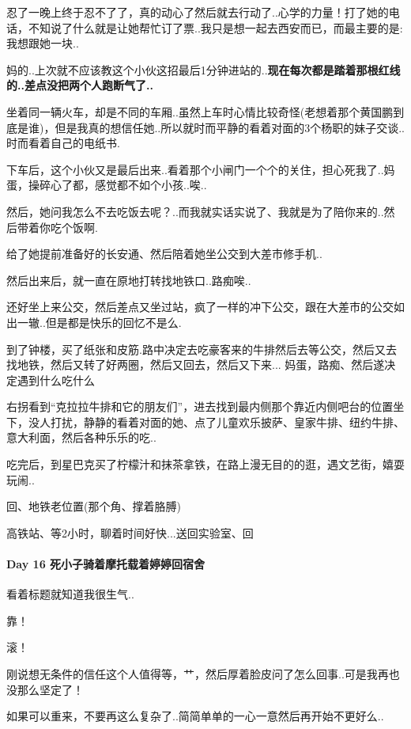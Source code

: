 \documentclass[UTF8,a4paper,8pt]{ctexbook}
\begin{document}
	 	 忍了一晚上终于忍不了了，真的动心了然后就去行动了..心学的力量！打了她的电话，不知说了什么就是让她帮忙订了票..我只是想一起去西安而已，而最主要的是:我想跟她一块..
	 	 
	 	 妈的..上次就不应该教这个小伙这招最后1分钟进站的..\textbf{现在每次都是踏着那根红线的..差点没把两个人跑断气了..}
	 	 
	 	 坐着同一辆火车，却是不同的车厢..虽然上车时心情比较奇怪(老想着那个黄国鹏到底是谁)，但是我真的想信任她..所以就时而平静的看着对面的3个杨职的妹子交谈..时而看着自己的电纸书.
	 	 
	 	 下车后，这个小伙又是最后出来..看着那个小闸门一个个的关住，担心死我了..妈蛋，操碎心了都，感觉都不如个小孩..唉..
	 	 
	 	 然后，她问我怎么不去吃饭去呢？..而我就实话实说了、我就是为了陪你来的..然后带着你吃个饭啊.
	 	 
	 	 给了她提前准备好的长安通、然后陪着她坐公交到大差市修手机..
	 	 
	 	 然后出来后，就一直在原地打转找地铁口..路痴唉..
	 	 
	 	 还好坐上来公交，然后差点又坐过站，疯了一样的冲下公交，跟在大差市的公交如出一辙..但是都是快乐的回忆不是么.
	 	 
	 	 到了钟楼，买了纸张和皮筋.路中决定去吃豪客来的牛排然后去等公交，然后又去找地铁，然后又转了好两圈，然后又回去，然后又下来... 妈蛋，路痴、然后遂决定遇到什么吃什么
	 	 
	 	 右拐看到“克拉拉牛排和它的朋友们”，进去找到最内侧那个靠近内侧吧台的位置坐下，没人打扰，静静的看着对面的她、点了儿童欢乐披萨、皇家牛排、纽约牛排、意大利面，然后各种乐乐的吃..
	 	 
	 	 吃完后，到星巴克买了柠檬汁和抹茶拿铁，在路上漫无目的的逛，遇文艺街，嬉耍玩闹..
	 	 
	 	 回、地铁老位置(那个角、撑着胳膊)
	 	 
	 	 高铁站、等2小时，聊着时间好快...送回实验室、回
 	 \paragraph{Day 16  死小子骑着摩托载着婷婷回宿舍  \quad     }
	 	 看着标题就知道我很生气..
	 	 
	 	 靠！
	 	 
	 	 滚！
	 	 
	 	 刚说想无条件的信任这个人值得等，艹，然后厚着脸皮问了怎么回事..可是我再也没那么坚定了！
	 	 
	 	 如果可以重来，不要再这么复杂了..简简单单的一心一意然后再开始不更好么.. 
	 	 
\end{document}
